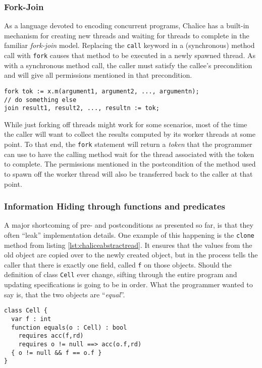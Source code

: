 \subsubsection{Fork-Join}
As a language devoted to encoding concurrent programs, Chalice has a built-in mechanism for creating new threads and waiting for threads to complete in the familiar \emph{fork-join} model.
Replacing the \lstinline[language=Chalice]!call! keyword in a (synchronous) method call with \lstinline[language=Chalice]!fork! causes that method to be executed in a newly spawned thread.
As with a synchronous method call, the caller must satisfy the callee's precondition and will give all permissions mentioned in that precondition.

\begin{lstlisting}[language=Chalice]
fork tok := x.m(argument1, argument2, ..., argumentn);
// do something else
join result1, result2, ..., resultn := tok;
\end{lstlisting}

While just forking off threads might work for some scenarios, most of the time the caller will want to collect the results computed by its worker threads at some point.
To that end, the \lstinline[language=Chalice]!fork! statement will return a \emph{token} that the programmer can use to have the calling method wait for the thread associated with the token to complete.
The permissions mentioned in the postcondition of the method used to spawn off the worker thread will also be transferred back to the caller at that point.

\subsubsection{Information Hiding through functions and predicates}
A major shortcoming of pre- and postconditions as presented so far, is that they often ``leak'' implementation details. 
One example of this happening is the \lstinline!clone! method from listing \ref{lst:chaliceabstractread}. 
It ensures that the values from the old object are copied over to the newly created object, but in the process tells the caller that there is exactly one field, called \lstinline!f! on those objects. 
Should the definition of class \lstinline!Cell! ever change, sifting through the entire program and updating specifications is going to be in order.
What the programmer wanted to say is, that the two objects are ``\emph{equal}''. 

\begin{lstlisting}[language=Chalice,float,caption={Alternative definition of \lstinline!Cell! using functions.},label={lst:chaliceequalsfunc}]
class Cell {
  var f : int
  function equals(o : Cell) : bool
    requires acc(f,rd)
    requires o != null ==> acc(o.f,rd)
  { o != null && f == o.f }
}
\end{lstlisting}

